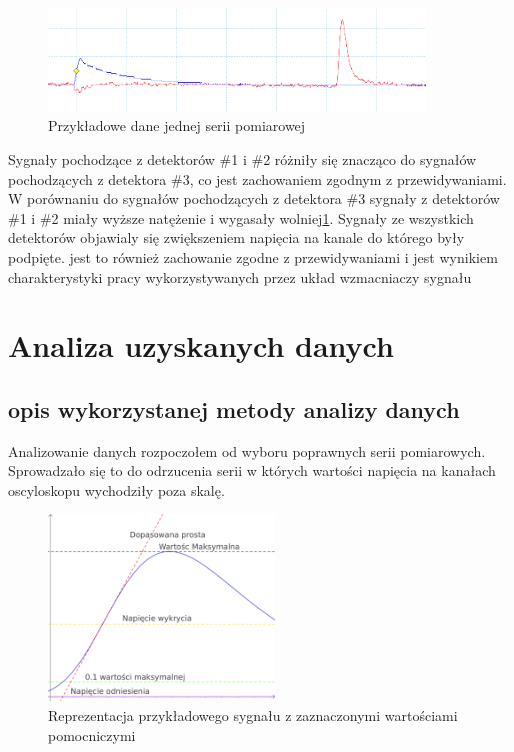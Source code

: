 \documentclass[10pt,a4paper]{article}
\begin{document}
\begin{figure}[h]
    \centering
    \includegraphics[width=10cm]{diagrams/13_1800_png_19.png}
    \caption{Przykładowe dane jednej serii pomiarowej}
    \label{przykladowe}
\end{figure}

Sygnały pochodzące z detektorów \#1 i \#2 różniły się znacząco do sygnałów pochodzących z detektora \#3, co jest zachowaniem zgodnym z przewidywaniami. W porównaniu do sygnałów pochodzących z detektora \#3 sygnały z detektorów \#1 i \#2 miały wyższe natężenie i wygasały wolniej\ref{przykladowe}. Sygnały ze wszystkich detektorów objawialy się zwiększeniem napięcia na kanale do którego były podpięte. jest to również zachowanie zgodne z przewidywaniami i jest wynikiem charakterystyki pracy wykorzystywanych przez układ wzmacniaczy sygnału \cite{opracowanie}

\section{Analiza uzyskanych danych}

\subsection{opis wykorzystanej metody analizy danych}

Analizowanie danych rozpoczołem od wyboru poprawnych serii pomiarowych. Sprowadzało się to do odrzucenia serii w których wartości napięcia na kanałach oscyloskopu wychodziły poza skalę.

\begin{figure}
    \centering
    \includegraphics[width=6cm]{diagrams/analiza.pdf}
    \caption{Reprezentacja przykładowego sygnału z zaznaczonymi wartościami pomocniczymi}
    \label{pomoc}
\end{figure}
\end{document}
